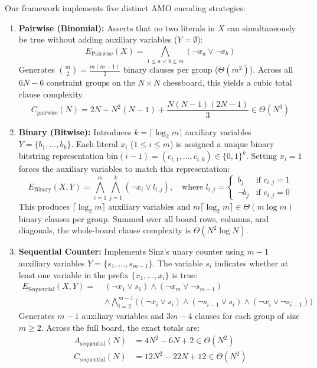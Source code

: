 Our framework implements five distinct AMO encoding strategies:
\begin{enumerate}
\item \textbf{Pairwise (Binomial):} Asserts that no two literals in $X$ can simultaneously be true without adding auxiliary variables ($Y = \emptyset$):
\begin{equation}
E_{\text{Pairwise}}(X) = \bigwedge_{1 \le a < b \le m} (\neg x_a \lor \neg x_b)
\end{equation}
Generates $\binom{m}{2} = \frac{m(m-1)}{2}$ binary clauses per group ($\Theta(m^2)$). Across all $6N-6$ constraint groups on the $N \times N$ chessboard, this yields a cubic total clause complexity.
\begin{equation}
\label{eq:pairwise_exact}
C_{\text{pairwise}}(N) = 2N + N^2(N-1) + \frac{N(N-1)(2N-1)}{3} \in \Theta(N^3)
\end{equation}

\item \textbf{Binary (Bitwise):} Introduces $k = \lceil \log_2 m \rceil$ auxiliary variables $Y = \{b_1, \dots, b_k\}$. Each literal $x_i$ ($1 \le i \le m$) is assigned a unique binary bitstring representation $\text{bin}(i-1) = (c_{i,1}, \dots, c_{i,k}) \in \{0, 1\}^k$. Setting $x_i = 1$ forces the auxiliary variables to match this representation:
\begin{equation}
E_{\text{Binary}}(X, Y) = \bigwedge_{i=1}^{m} \bigwedge_{j=1}^{k} \left( \neg x_i \lor l_{i,j} \right), \quad \text{where } l_{i,j} = \begin{cases} b_j & \text{if } c_{i,j} = 1 \\ \neg b_j & \text{if } c_{i,j} = 0 \end{cases}
\end{equation}
This produces $\lceil \log_2 m \rceil$ auxiliary variables and $m \lceil \log_2 m \rceil \in \Theta(m \log m)$ binary clauses per group. Summed over all board rows, columns, and diagonals, the whole-board clause complexity is $\Theta(N^2 \log N)$.

\item \textbf{Sequential Counter:} Implements Sinz's unary counter \citep{sinz2005towards} using $m-1$ auxiliary variables $Y = \{s_1, \dots, s_{m-1}\}$. The variable $s_i$ indicates whether at least one variable in the prefix $\{x_1, \dots, x_i\}$ is true:
\begin{align}
E_{\text{Sequential}}(X, Y) = \; & (\neg x_1 \lor s_1) \land (\neg x_m \lor \neg s_{m-1}) \nonumber \\
& \land \bigwedge_{i=2}^{m-1} \Big( (\neg x_i \lor s_i) \land (\neg s_{i-1} \lor s_i) \land (\neg x_i \lor \neg s_{i-1}) \Big)
\end{align}
Generates $m-1$ auxiliary variables and $3m-4$ clauses for each group of size $m \ge 2$. Across the full board, the exact totals are:
\begin{align}
A_{\text{sequential}}(N) &= 4N^2 - 6N + 2 \in \Theta(N^2) \\
C_{\text{sequential}}(N) &= 12N^2 - 22N + 12 \in \Theta(N^2)
\end{align}


\end{enumerate}
